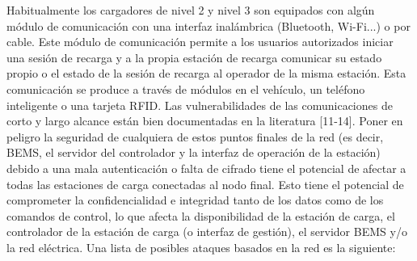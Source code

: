 \documentclass[12pt,a4paper,onecolumn,oneside]{report}
\begin{document}
Habitualmente los cargadores de nivel 2 y nivel 3 son equipados con algún módulo de comunicación con una interfaz inalámbrica (Bluetooth, Wi-Fi...) o por cable. Este módulo de comunicación permite a los usuarios autorizados iniciar una sesión de recarga y a la propia estación de recarga comunicar su estado propio o el estado de la sesión de recarga al operador de la misma estación. Esta comunicación se produce a través de módulos en el vehículo, un teléfono inteligente o una tarjeta RFID. Las vulnerabilidades de las comunicaciones de corto y largo alcance están bien documentadas en la literatura [11-14]. Poner en peligro la seguridad de cualquiera de estos puntos finales de la red (es decir, BEMS, el servidor del controlador y la interfaz de operación de la estación) debido a una mala autenticación o falta de cifrado tiene el potencial de afectar a todas las estaciones de carga conectadas al nodo final. Esto tiene el potencial de comprometer la confidencialidad e integridad tanto de los datos como de los comandos de control, lo que afecta la disponibilidad de la estación de carga, el controlador de la estación de carga (o interfaz de gestión), el servidor BEMS y/o la red eléctrica. 
Una lista de posibles ataques basados en la red es la siguiente:
\end{document}
